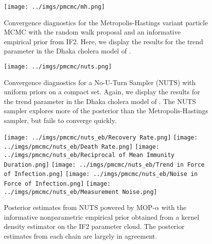 
\begin{figure}[H]
    \centering
    \texttt{[image: ../imgs/pmcmc/mh.png]}
    \caption{Convergence diagnostics for the Metropolis-Hastings variant particle MCMC with the random walk proposal and an informative empirical prior from IF2. Here, we display the results for the trend parameter in the Dhaka cholera model of \cite{king08}.}
    \label{fig:mh}
\end{figure}


\begin{figure}[H]
    \centering
    \texttt{[image: ../imgs/pmcmc/nuts.png]}
    \caption{Convergence diagnostics for a No-U-Turn Sampler (NUTS) with uniform priors on a compact set. Again, we display the results for the trend parameter in the Dhaka cholera model of \cite{king08}. The NUTS sampler explores more of the posterior than the Metropolis-Hastings sampler, but fails to converge quickly.}
    \label{fig:nuts}
\end{figure}


\begin{figure}[H]
    \centering
    \texttt{[image: ../imgs/pmcmc/nuts\_eb/Recovery Rate.png]}
    \texttt{[image: ../imgs/pmcmc/nuts\_eb/Death Rate.png]}
    \texttt{[image: ../imgs/pmcmc/nuts\_eb/Reciprocal of Mean Immunity Duration.png]}
    \texttt{[image: ../imgs/pmcmc/nuts\_eb/Trend in Force of Infection.png]}
    \texttt{[image: ../imgs/pmcmc/nuts\_eb/Noise in Force of Infection.png]}
    \texttt{[image: ../imgs/pmcmc/nuts\_eb/Measurement Noise.png]}
    \caption{Posterior estimates from NUTS powered by MOP-$\alpha$ with the informative nonparametric empirical prior obtained from a kernel density estimator on the IF2 parameter cloud. The posterior estimates from each chain are largely in agreement.}
    \label{fig:posteriors}
\end{figure}

